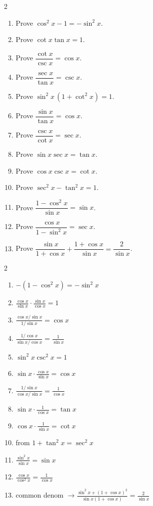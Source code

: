 \documentclass[11pt]{article}
\begin{document}
\begin{recapbox}
\begin{multicols}{2}
\small
\begin{enumerate}[leftmargin=*,itemsep=3pt]
  \item Prove $\cos^2 x-1=-\sin^2 x$.
  \item Prove $\cot x\tan x=1$.
  \item Prove $\dfrac{\cot x}{\csc x}=\cos x$.
  \item Prove $\dfrac{\sec x}{\tan x}=\csc x$.
  \item Prove $\sin^2 x\,(1+\cot^2 x)=1$.
  \item Prove $\dfrac{\sin x}{\tan x}=\cos x$.
  \item Prove $\dfrac{\csc x}{\cot x}=\sec x$.
  \item Prove $\sin x\sec x=\tan x$.
  \item Prove $\cos x\csc x=\cot x$.
  \item Prove $\sec^2 x-\tan^2 x=1$.
  \item Prove $\dfrac{1-\cos^2 x}{\sin x}=\sin x$.
  \item Prove $\dfrac{\cos x}{1-\sin^2 x}=\sec x$.
  \item Prove $\dfrac{\sin x}{1+\cos x}+\dfrac{1+\cos x}{\sin x}=\dfrac{2}{\sin x}$.
\end{enumerate}
\end{multicols}
\end{recapbox}

\begin{keybox}
\begin{multicols}{2}
\small
\begin{enumerate}[leftmargin=*,itemsep=3pt]
  \item $-(1-\cos^2 x)=-\sin^2 x$
  \item $\tfrac{\cos x}{\sin x}\cdot\tfrac{\sin x}{\cos x}=1$
  \item $\tfrac{\cos x/\sin x}{1/\sin x}=\cos x$
  \item $\tfrac{1/\cos x}{\sin x/\cos x}=\tfrac1{\sin x}$
  \item $\sin^2 x\csc^2 x=1$
  \item $\sin x\cdot\tfrac{\cos x}{\sin x}=\cos x$
  \item $\tfrac{1/\sin x}{\cos x/\sin x}=\tfrac1{\cos x}$
  \item $\sin x\cdot\tfrac1{\cos x}=\tan x$
  \item $\cos x\cdot\tfrac1{\sin x}=\cot x$
  \item from $1+\tan^2 x=\sec^2 x$
  \item $\tfrac{\sin^2 x}{\sin x}=\sin x$
  \item $\tfrac{\cos x}{\cos^2 x}=\tfrac1{\cos x}$
  \item common denom $\to\tfrac{\sin^2 x+(1+\cos x)^2}{\sin x(1+\cos x)}=\tfrac{2}{\sin x}$
\end{enumerate}
\end{multicols}
\end{keybox}
\end{document}
